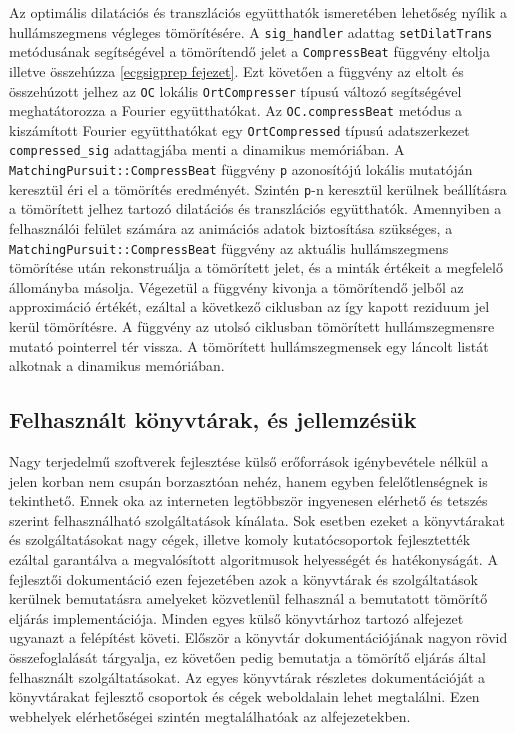 \documentclass[oneside,titlepage,12pt,a4paper]{report}
\begin{document}
\par Az optimális dilatációs és transzlációs együtthatók ismeretében lehetőség nyílik a hullámszegmens végleges tömörítésére. A \texttt{sig\_handler} adattag \texttt{setDilatTrans} metódusának segítségével a tömörítendő jelet a \texttt{CompressBeat} függvény eltolja illetve összehúzza \ref{ecgsigprep fejezet}. Ezt követően a függvény az eltolt és összehúzott jelhez az \texttt{OC} lokális \texttt{OrtCompresser} típusú változó segítségével meghatátorozza a Fourier együtthatókat. Az \texttt{OC.compressBeat} metódus a kiszámított Fourier együtthatókat egy \texttt{OrtCompressed} típusú adatszerkezet \texttt{compressed\_sig} adattagjába menti a dinamikus memóriában. A \texttt{MatchingPursuit::CompressBeat} függvény \texttt{p} azonosítójú lokális mutatóján keresztül éri el a tömörítés eredményét. Szintén \texttt{p}-n keresztül kerülnek beállításra a tömörített jelhez tartozó dilatációs és transzlációs együtthatók. Amennyiben a felhasználói felület számára az animációs adatok biztosítása szükséges, a \linebreak \texttt{MatchingPursuit::CompressBeat} függvény az aktuális hullámszegmens tömörítése után rekonstruálja a tömörített jelet, és a minták értékeit a megfelelő állományba másolja. Végezetül a függvény kivonja a tömörítendő jelből az approximáció értékét, ezáltal a következő ciklusban az így kapott reziduum jel kerül tömörítésre. A függvény az utolsó ciklusban tömörített hullámszegmensre mutató pointerrel tér vissza. A tömörített hullámszegmensek egy láncolt listát alkotnak a dinamikus memóriában. 

\subsection{Felhasznált könyvtárak, és jellemzésük}

Nagy terjedelmű szoftverek fejlesztése külső erőforrások igénybevétele nélkül a jelen korban nem csupán borzasztóan nehéz, hanem egyben felelőtlenségnek is tekinthető. Ennek oka az interneten legtöbbször ingyenesen elérhető és tetszés szerint felhasználható szolgáltatások kínálata. Sok esetben ezeket a könyvtárakat és szolgáltatásokat nagy cégek, illetve komoly kutatócsoportok fejlesztették ezáltal garantálva a megvalósított algoritmusok helyességét és hatékonyságát. A fejlesztői dokumentáció ezen fejezetében azok a könyvtárak és szolgáltatások kerülnek bemutatásra amelyeket közvetlenül felhasznál a bemutatott tömörítő eljárás implementációja. Minden egyes külső könyvtárhoz tartozó alfejezet ugyanazt a felépítést követi. Először a könyvtár dokumentációjának nagyon rövid összefoglalását tárgyalja, ez követően pedig  bemutatja a tömörítő eljárás által felhasznált szolgáltatásokat. Az egyes könyvtárak részletes dokumentációját a könyvtárakat fejlesztő csoportok és cégek weboldalain lehet megtalálni. Ezen webhelyek elérhetőségei szintén megtalálhatóak az alfejezetekben. 
\end{document}
